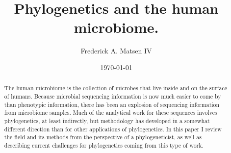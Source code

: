 \documentclass{amsart}
\newcommand{\forarxiv}[1]{#1}
\newcommand{\notforarxiv}[1]{}
\begin{document}
\notforarxiv{
\begin{flushright}
Version dated: \today
\end{flushright}
\bigskip
\noindent RH: PHYLOGENETICS AND THE HUMAN MICROBIOME
\bigskip
\medskip
\begin{center}

\noindent{\Large \bf Phylogenetics and the human microbiome.}
\bigskip

\noindent {\normalsize \sc
Frederick A. Matsen IV$^1$}\\
\noindent {\small \it
$^1$
Program in Computational Biology, Fred Hutchinson Cancer Research Center, Seattle, WA, 91802, USA}\\
\end{center}
\medskip
\noindent{\bf Corresponding author:} Frederick A Matsen, Program in Computational Biology, Fred Hutchinson Cancer Research Center, Seattle, WA, 91802, USA; E-mail: matsen@fhcrc.org.\\
\vspace{1in}
}

\forarxiv{\
\title{Phylogenetics and the human microbiome.}
\author{Frederick A. Matsen IV}
\date{\today}
\begin{abstract}
}
\notforarxiv{
\subsubsection{Abstract}
}

The human microbiome is the collection of microbes that live inside and on the surface of humans.
Because microbial sequencing information is now much easier to come by than phenotypic information, there has been an explosion of sequencing information from microbiome samples.
Much of the analytical work for these sequences involves phylogenetics, at least indirectly, but methodology has developed in a somewhat different direction than for other applications of phylogenetics.
In this paper I review the field and its methods from the perspective of a phylogeneticist, as well as describing current challenges for phylogenetics coming from this type of work.

\forarxiv{
\end{abstract}
\maketitle
}

\notforarxiv{
\noindent (Keywords: human microbiome; microbial ecology; phylogenetic methods; review)\\
\vspace{1.5in}
}
\end{document}
